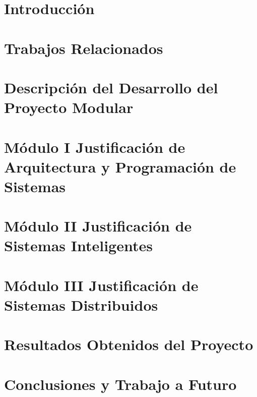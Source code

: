 \documentclass[10pt,twocolumn,letterpaper]{article}
\begin{document}
\section{Introducción}
\section{Trabajos Relacionados}
\section{Descripción del Desarrollo del Proyecto Modular}
\section*{Módulo I Justificación de Arquitectura y Programación de Sistemas}
\section*{Módulo II Justificación de Sistemas Inteligentes}
\section*{Módulo III Justificación de Sistemas Distribuidos}
\section{Resultados Obtenidos del Proyecto}
\section{Conclusiones y Trabajo a Futuro}


\nocite{*} %

\clearpage


\end{document}
